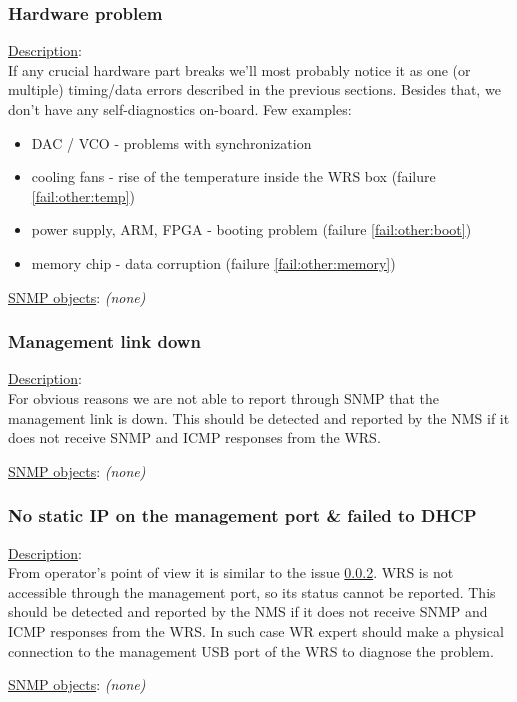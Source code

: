 \subsubsection{\bf Hardware problem}
		\begin{packed_enum}
			\item [] \underline{Description}:\\
				If any crucial hardware part breaks we'll most probably notice it as one
				(or multiple) timing/data errors described in the previous sections.
				Besides that, we don't have any self-diagnostics on-board. Few examples:
				\begin{itemize}
					\item DAC / VCO - problems with synchronization
					\item cooling	fans - rise of the temperature inside the WRS box
						(failure \ref{fail:other:temp})
					\item power supply, ARM, FPGA - booting problem (failure
						\ref{fail:other:boot})
					\item memory chip - data corruption (failure \ref{fail:other:memory})
				\end{itemize}
			\item [] \underline{SNMP objects}: \emph{(none)}
		\end{packed_enum}

\subsubsection{\bf Management link down}
		\label{fail:other:management_link}
		\begin{packed_enum}
			\item [] \underline{Description}:\\
				For obvious reasons we are not able to report through SNMP that the
				management link is down. This should be detected and reported by the NMS
				if it does not receive SNMP and ICMP responses from the WRS.
			\item [] \underline{SNMP objects}: \emph{(none)}
		\end{packed_enum}

\subsubsection{\bf No static IP on the management port \& failed to DHCP}
		\begin{packed_enum}
			\item [] \underline{Description}:\\
				From operator's point of view it is similar to the issue
				\ref{fail:other:management_link}. WRS is not accessible through the
				management port, so its status cannot be reported. This should be
				detected and reported by the NMS if it does not receive SNMP and ICMP
				responses from the WRS. In such case WR expert should make a physical
				connection to the management USB port of the WRS to diagnose the
				problem.
			\item [] \underline{SNMP objects}: \emph{(none)}
		\end{packed_enum}

